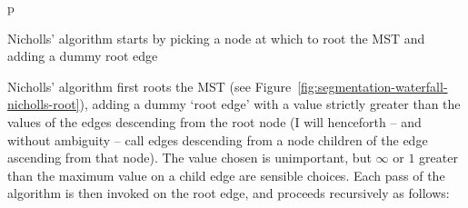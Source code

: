 \begin{stusubfig}{p}
	\hspace{4mm}%
\caption{Nicholls' algorithm starts by picking a node at which to root the MST and adding a dummy root edge}
\label{fig:segmentation-waterfall-nicholls-root}
\end{stusubfig}

Nicholls' algorithm first roots the MST (see Figure~\ref{fig:segmentation-waterfall-nicholls-root}), adding a dummy `root edge' with a value strictly greater than the values of the edges descending from the root node (I will henceforth -- and without ambiguity -- call edges descending from a node children of the edge ascending from that node). The value chosen is unimportant, but $\infty$ or $1$ greater than the maximum value on a child edge are sensible choices. Each pass of the algorithm is then invoked on the root edge, and proceeds recursively as follows:

